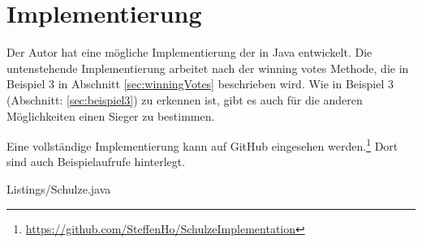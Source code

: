 \section{Implementierung}
\label{sec:implementierung}

Der Autor hat eine mögliche Implementierung der \schulze in Java entwickelt. Die untenstehende Implementierung arbeitet nach der \glqq winning votes \grqq{} Methode, die in Beispiel 3 in Abschnitt \ref{sec:winningVotes} beschrieben wird. Wie in Beispiel 3 (Abschnitt: \ref{sec:beispiel3}) zu erkennen ist, gibt es auch für die anderen Möglichkeiten einen Sieger zu bestimmen.

Eine vollständige Implementierung kann auf GitHub eingesehen werden.\footnote{\url{https://github.com/SteffenHo/SchulzeImplementation}} Dort sind auch Beispielaufrufe hinterlegt. 


{Listings/Schulze.java}


